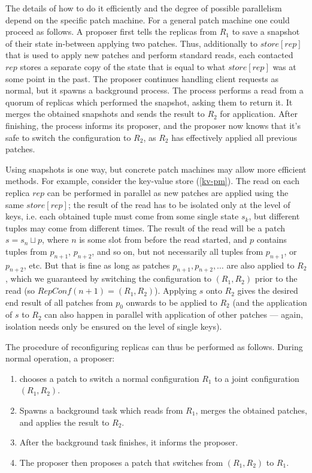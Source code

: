 \documentclass[12pt,a4paper,en]{pracamgr}
\begin{document}
The details of how to do it efficiently and the degree of possible parallelism depend on the specific patch machine. For a general patch machine one could proceed as follows. A proposer first tells the replicas from $R_1$ to save a snapshot of their state in-between applying two patches. Thus, additionally to $store[rep]$ that is used to apply new patches and perform standard reads, each contacted $rep$ stores a separate copy of the state that is equal to what $store[rep]$ was at some point in the past. The proposer continues handling client requests as normal, but it spawns a background process. The process performs a read from a quorum of replicas which performed the snapshot, asking them to return it. It merges the obtained snapshots and sends the result to $R_2$ for application. After finishing, the process informs its proposer, and the proposer now knows that it's safe to switch the configuration to $R_2$, as $R_2$ has effectively applied all previous patches.

Using snapshots is one way, but concrete patch machines may allow more efficient methods. For example, consider the key-value store (\ref{kv-pm}). The read on each replica $rep$ can be performed in parallel as new patches are applied using the same $store[rep]$; the result of the read has to be isolated only at the level of keys, i.e. each obtained tuple must come from some single state $s_k$, but different tuples may come from different times. The result of the read will be a patch $s = s_n \sqcup p$, where $n$ is some slot from before the read started, and $p$ contains tuples from $p_{n+1}$, $p_{n+2}$, and so on, but not necessarily all tuples from $p_{n+1}$, or $p_{n+2}$, etc. But that is fine as long as patches $p_{n+1}, p_{n+2}, \dots$ are also applied to $R_2$, which we guaranteed by switching the configuration to $(R_1, R_2)$ prior to the read (so $RepConf(n+1) = (R_1, R_2)$). Applying $s$ onto $R_2$ gives the desired end result of all patches from $p_0$ onwards to be applied to $R_2$ (and the application of $s$ to $R_2$ can also happen in parallel with application of other patches --- again, isolation needs only be ensured on the level of single keys).

The procedure of reconfiguring replicas can thus be performed as follows. During normal operation, a proposer:
\begin{enumerate}
    \item chooses a patch to switch a normal configuration $R_1$ to a joint configuration $(R_1, R_2)$.
    \item Spawns a background task which reads from $R_1$, merges the obtained patches, and applies the result to $R_2$.
    \item After the background task finishes, it informs the proposer.
    \item The proposer then proposes a patch that switches from $(R_1, R_2)$ to $R_1$.
\end{enumerate}
\end{document}
